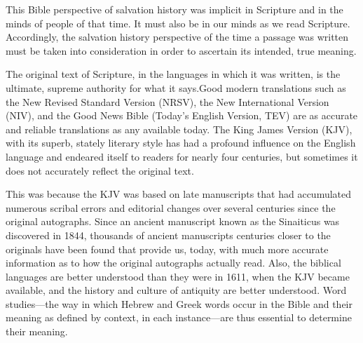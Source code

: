 This Bible perspective of salvation history was implicit in Scripture and in
the minds of people of that time. It must also be in our minds as we read
Scripture. Accordingly, the salvation history perspective of the time a
passage was written must be taken into consideration in order to ascertain
its intended, true meaning.

The original text of Scripture, in the languages in which it was written, is
the ultimate, supreme authority for what it says.Good modern translations
such as the New Revised Standard Version (NRSV), the New International 
Version (NIV), and the Good News Bible (Today's English Version, TEV) are as
accurate and reliable translations as any available today. The King James
Version (KJV), with its superb, stately literary style has had a profound
influence on the English language and endeared itself to readers for nearly
four centuries, but sometimes it does not accurately reflect the original
text.

This was because the KJV was based on late manuscripts that had accumulated
numerous scribal errors and editorial changes over several centuries since
the original autographs. Since an ancient manuscript known as the Sinaiticus
was discovered in 1844, thousands of ancient manuscripts centuries closer to
the originals have been found that provide us, today, with much more
accurate information as to how the original autographs actually read.
Also, the biblical languages are better understood than they were in 1611,
when the KJV became available, and the history and culture of antiquity are
better understood. Word studies---the way in which Hebrew and Greek words
occur in the Bible and their meaning as defined by context, in each
instance---are thus essential to determine their meaning.


